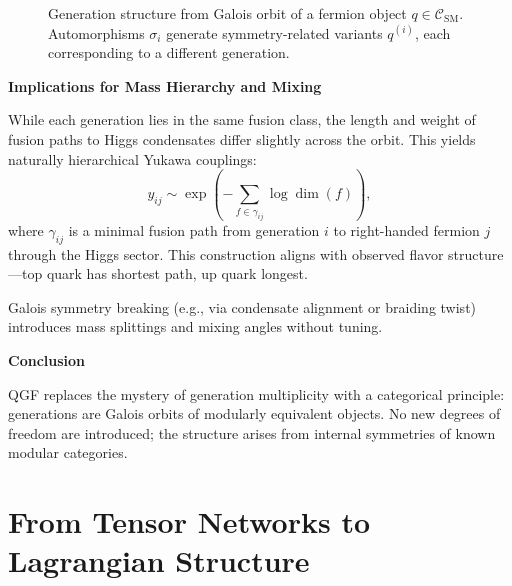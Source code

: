 \documentclass[11pt]{article}
\def\left{}
\def\right{}
\begin{document}
\begin{figure}[H]
\centering
{}
\caption{Generation structure from Galois orbit of a fermion object \( q \in \mathcal{C}_{\text{SM}} \). Automorphisms \( \sigma_i \) generate symmetry-related variants \( q^{(i)} \), each corresponding to a different generation.}
\label{fig:galois-generations}
\end{figure}

\vspace{0.5em}
\noindent\textbf{Implications for Mass Hierarchy and Mixing}

While each generation lies in the same fusion class, the length and weight of fusion paths to Higgs condensates differ slightly across the orbit. This yields naturally hierarchical Yukawa couplings:
\[
y_{ij} \sim \exp\left( -\sum_{f \in \gamma_{ij}} \log \dim(f) \right),
\]
where \( \gamma_{ij} \) is a minimal fusion path from generation \( i \) to right-handed fermion \( j \) through the Higgs sector. This construction aligns with observed flavor structure—top quark has shortest path, up quark longest.

Galois symmetry breaking (e.g., via condensate alignment or braiding twist) introduces mass splittings and mixing angles without tuning.

\vspace{0.5em}
\noindent\textbf{Conclusion}

QGF replaces the mystery of generation multiplicity with a categorical principle: generations are Galois orbits of modularly equivalent objects. No new degrees of freedom are introduced; the structure arises from internal symmetries of known modular categories.



\section{From Tensor Networks to Lagrangian Structure}
\end{document}
